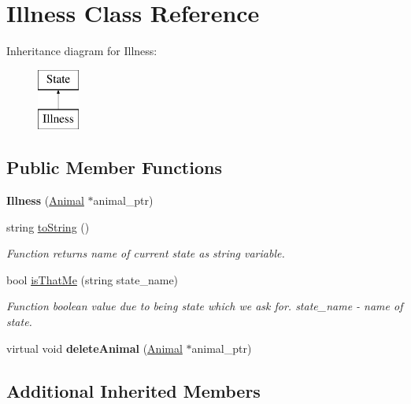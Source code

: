 \hypertarget{class_illness}{}\section{Illness Class Reference}
\label{class_illness}
Inheritance diagram for Illness\+:\begin{figure}[H]
\begin{center}
\leavevmode
\includegraphics[height=2.000000cm]{class_illness}
\end{center}
\end{figure}
\subsection*{Public Member Functions}
\begin{DoxyCompactItemize}
\item 
\hypertarget{class_illness_a10b1581156c9a2f28ab90f66dc10c916}{}{\bfseries Illness} (\hyperlink{class_animal}{Animal} $\ast$animal\+\_\+ptr)\label{class_illness_a10b1581156c9a2f28ab90f66dc10c916}

\item 
string \hyperlink{class_illness_a912faaaf9f062c74bf9daeddc0c14e03}{to\+String} ()
\begin{DoxyCompactList}\small\item\em Function returns name of current state as string variable. \end{DoxyCompactList}\item 
bool \hyperlink{class_illness_a06f776b529209a716600688a8b4b7f62}{is\+That\+Me} (string state\+\_\+name)
\begin{DoxyCompactList}\small\item\em Function boolean value due to being state which we ask for.  state\+\_\+name -\/ name of state. \end{DoxyCompactList}\item 
\hypertarget{class_illness_acee2254c341c97c5357eeb060dec4dbe}{}virtual void {\bfseries delete\+Animal} (\hyperlink{class_animal}{Animal} $\ast$animal\+\_\+ptr)\label{class_illness_acee2254c341c97c5357eeb060dec4dbe}

\end{DoxyCompactItemize}
\subsection*{Additional Inherited Members}


